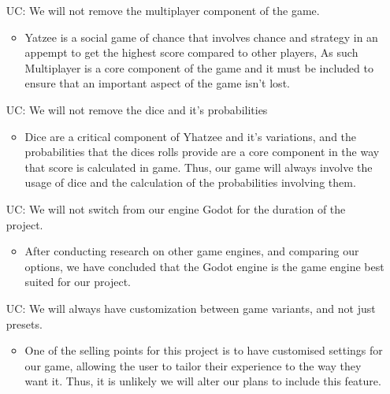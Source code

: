 \noindent \begin{itemize}

\item[UC\refstepcounter{ucnum}\theucnum \label{ULC_multiplayer}:] We will not remove the multiplayer component of the game.

\begin{itemize}
	\item Yatzee is a social game of chance that involves chance and strategy in an appempt to get the highest score compared to other players, As such Multiplayer is a core component of the game and it must be included to ensure that an important aspect of the game isn't lost.
\end{itemize}

	
\item[UC\refstepcounter{ucnum}\theucnum \label{ULC_dice}:] We will not remove the dice and it's probabilities 

\begin{itemize}
	\item Dice are a critical component of Yhatzee and it's variations, and the probabilities that the dices rolls provide are a core component in the way that score is calculated in game. Thus, our game will always involve the usage of dice and the calculation of the probabilities involving them.
\end{itemize}


\item[UC\refstepcounter{ucnum}\theucnum \label{ULC_godot}:] We will not switch from our engine Godot for the duration of the project.

\begin{itemize}
	\item After conducting research on other game engines, and comparing our options, we have concluded that the Godot engine is the game engine best suited for our project.
\end{itemize}

\item[UC\refstepcounter{ucnum}\theucnum \label{ULC_customization}:] We will always have customization between game variants, and not just presets.


\begin{itemize}
	\item One of the selling points for this project is to have customised settings for our game, allowing the user to tailor their experience to the way they want it. Thus, it is unlikely we will alter our plans to include this feature.
\end{itemize}


\end{itemize}
